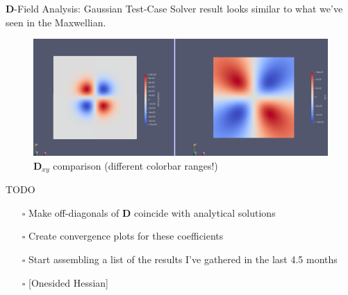 \begin{frame}[c]{$\boldsymbol D$-Field Analysis: Gaussian Test-Case}
    Solver result looks similar to what we've seen in the Maxwellian. \\
    
    \begin{figure}[!htb]
        \centering
        \captionsetup{justification=centering}
      \includegraphics[width=1.05\linewidth]{figures/D01.png}
      \caption{$\boldsymbol D_{xy}$ comparison (different colorbar ranges!)}
      \label{fig:D00_comparison}
    \end{figure}
\end{frame}

\begin{frame}[c]{TODO}
    \begin{itemize}
        \item[$\square$] Make off-diagonals of $\boldsymbol D$ coincide with analytical solutions
        \item[$\square$] Create convergence plots for these coefficients
        \item[$\square$] Start assembling a list of the results I've gathered in the last 4.5 months
        \item[$\square$] [Onesided Hessian]
    \end{itemize}
\end{frame}


